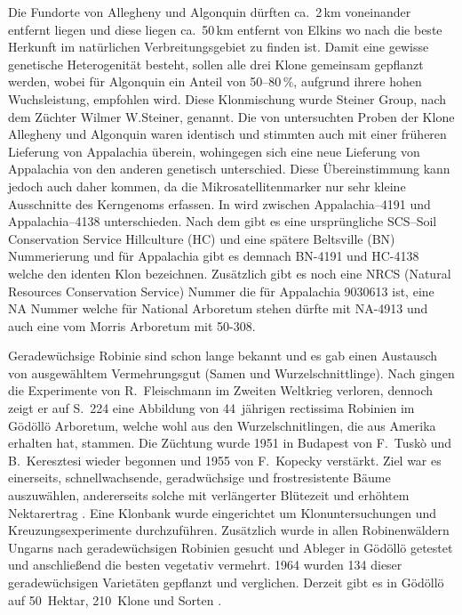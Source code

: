\documentclass[twocolumn]{scrartcl}
\begin{document}
Die Fundorte von Allegheny und Algonquin dürften ca.\ 2\,km
voneinander entfernt liegen und diese liegen ca.\ 50\,km entfernt von Elkins wo
nach \citet{hopp1941robinie} die beste Herkunft im natürlichen Verbreitungsgebiet
zu finden ist.  Damit eine gewisse genetische Heterogenität besteht, sollen alle
drei Klone gemeinsam gepflanzt werden, wobei für Algonquin ein Anteil von
50--80\,\%, aufgrund ihrere hohen Wuchsleistung, empfohlen wird. Diese
Klonmischung wurde Steiner Group, nach dem Züchter Wilmer W.Steiner, genannt.
Die von \citet{liesebach2012robinie}
untersuchten Proben der Klone Allegheny und Algonquin waren identisch und
stimmten auch mit einer früheren Lieferung von Appalachia überein, wohingegen
sich eine neue Lieferung von Appalachia von den anderen genetisch unterschied.
Diese Übereinstimmung kann jedoch auch daher kommen, da die
Mikrosatellitenmarker nur sehr kleine Ausschnitte des Kerngenoms erfassen. In
\citet{liesebach2021robinie} wird zwischen Appalachia--4191 und Appalachia--4138
unterschieden. Nach dem \citet{steinergroup1987robinie} gibt es eine
ursprüngliche SCS--Soil Conservation Service Hillculture (HC) und eine spätere
Beltsville (BN) Nummerierung und für Appalachia gibt es demnach BN-4191 und
HC-4138 welche den identen Klon bezeichnen. Zusätzlich gibt es noch eine NRCS
(Natural Resources Conservation Service) Nummer die für Appalachia 9030613 ist,
eine NA Nummer welche für National Arboretum stehen dürfte mit NA-4913 und auch
eine vom Morris Arboretum mit 50-308.

Geradewüchsige Robinie sind schon lange bekannt und es gab einen
Austausch von ausgewähltem Vermehrungsgut (Samen und
Wurzelschnittlinge). Nach \citep{keresztesi1983robinie} gingen die
Experimente von R.~Fleischmann im Zweiten Weltkrieg verloren, dennoch
zeigt er auf S.~224 eine Abbildung von 44~jährigen rectissima Robinien
im Gödöllö Arboretum, welche wohl aus den Wurzelschnitlingen, die
\citet{mihalyi1937robinie} aus Amerika erhalten hat, stammen.  Die
Züchtung wurde 1951 in Budapest von F.~Tuskò und B.~Keresztesi wieder
begonnen und 1955 von F.~Kopecky verstärkt. Ziel war es einerseits,
schnellwachsende, geradwüchsige und frostresistente Bäume auszuwählen,
andererseits solche mit verlängerter Blütezeit und erhöhtem
Nektarertrag \citep{redei2007robinieSelektion,csiha2016robinie}.
Eine Klonbank wurde eingerichtet um Klonuntersuchungen
und Kreuzungsexperimente durchzuführen. Zusätzlich wurde in allen
Robinenwäldern Ungarns nach geradewüchsigen Robinien gesucht und
Ableger in Gödöllö getestet und anschließend die besten vegetativ
vermehrt. 1964 wurden 134 dieser geradewüchsigen Varietäten gepflanzt
und verglichen.  Derzeit gibt es in Gödöllö auf 50~Hektar, 210~Klone
und Sorten \citep{redei2005robinieVermehrung,csiha2016robinie}.
\end{document}

